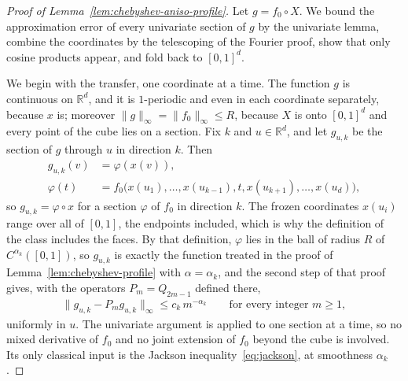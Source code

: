 \begin{proof}[Proof of Lemma~\ref{lem:chebyshev-aniso-profile}]
Let $g=f_0\circ X$. We bound the approximation error of every univariate section of $g$ by the univariate lemma, combine the coordinates by the telescoping of the Fourier proof, show that only cosine products appear, and fold back to $[0,1]^d$.

We begin with the transfer, one coordinate at a time. The function $g$ is continuous on $\mathbb R^d$, and it is $1$-periodic and even in each coordinate separately, because $x$ is; moreover $\|g\|_\infty=\|f_0\|_\infty\leq R$, because $X$ is onto $[0,1]^d$ and every point of the cube lies on a section. Fix $k$ and $u\in\mathbb R^d$, and let $g_{u,k}$ be the section of $g$ through $u$ in direction $k$. Then
\begin{align*}
g_{u,k}(v)&=\varphi(x(v)),\\
\varphi(t)&=f_0\bigl(x(u_1),\ldots,x(u_{k-1}),t,x(u_{k+1}),\ldots,x(u_d)\bigr),
\end{align*}
so $g_{u,k}=\varphi\circ x$ for a section $\varphi$ of $f_0$ in direction $k$. The frozen coordinates $x(u_i)$ range over all of $[0,1]$, the endpoints included, which is why the definition of the class includes the faces. By that definition, $\varphi$ lies in the ball of radius $R$ of $C^{\alpha_k}([0,1])$, so $g_{u,k}$ is exactly the function treated in the proof of Lemma~\ref{lem:chebyshev-profile} with $\alpha=\alpha_k$, and the second step of that proof gives, with the operators $P_m=Q_{2m-1}$ defined there,
\begin{align}
\|g_{u,k}-P_mg_{u,k}\|_\infty\leq c_k\,m^{-\alpha_k}
\qquad\text{for every integer }m\geq1,
\label{eq:cheb-aniso-section}
\end{align}
uniformly in $u$. The univariate argument is applied to one section at a time, so no mixed derivative of $f_0$ and no joint extension of $f_0$ beyond the cube is involved. Its only classical input is the Jackson inequality~\eqref{eq:jackson}, at smoothness $\alpha_k$.


\end{proof}
